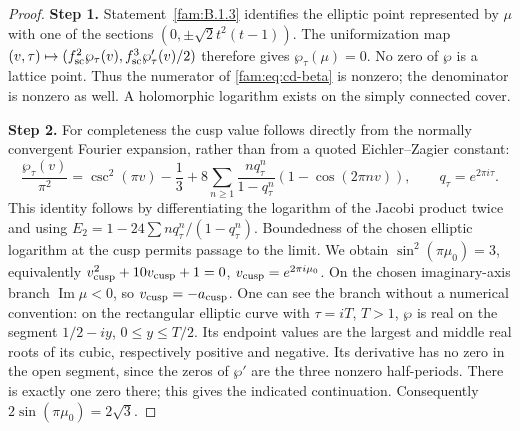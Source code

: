 \documentclass[11pt,a4paper]{article}
\theoremstyle{plain}
\theoremstyle{definition}
\begin{document}
\begin{proof}
\noindent\textbf{Step 1.} Statement~\ref{fam:B.1.3} identifies the elliptic point represented by \(\mu\) with
one of the sections \((0,\pm\sqrt2t^2(t-1))\). The uniformization map
\((v,\tau)\mapsto(f_{\rm sc}^2\wp_\tau(v),f_{\rm sc}^3\wp'_\tau(v)/2)\) therefore gives
\(\wp_\tau(\mu)=0\). No zero of \(\wp\) is a lattice point. Thus the numerator
of \eqref{fam:eq:cd-beta} is nonzero; the denominator is nonzero as well.
A holomorphic logarithm exists on the simply connected cover.


\noindent\textbf{Step 2.} For completeness the cusp value follows directly from the normally
convergent Fourier expansion, rather than from a quoted Eichler--Zagier
constant:
\begin{equation}\label{fam:eq:cd-wp}
 \frac{\wp_\tau(v)}{\pi^2}
 =\csc^2(\pi v)-\frac13+
 8\sum_{n\geq1}\frac{nq_\tau^n}{1-q_\tau^n}(1-\cos(2\pi nv)),
 \qquad q_\tau=e^{2\pi i\tau}.
\end{equation}
This identity follows by differentiating the logarithm of the Jacobi
product twice and using
\(E_2=1-24\sum nq_\tau^n/(1-q_\tau^n)\). Boundedness of the chosen elliptic logarithm
at the cusp permits passage to the limit. We obtain
\(\sin^2(\pi\mu_0)=3\), equivalently
\(v_{\rm cusp}^2+10v_{\rm cusp}+1=0\), \(v_{\rm cusp}=e^{2\pi i\mu_0}\).
On the chosen imaginary-axis branch \(\operatorname{Im}\mu<0\), so \(v_{\rm cusp}=-a_{\rm cusp}\).
One can see the branch without a numerical convention: on the rectangular
elliptic curve with \(\tau=iT\), \(T>1\), \(\wp\) is real on the segment
\(1/2-iy\), \(0\leq y\leq T/2\). Its endpoint values are the largest and
middle real roots of its cubic, respectively positive and negative.
Its derivative has no zero in the open segment, since the zeros of
\(\wp'\) are the three nonzero half-periods. There is exactly one zero
there; this gives the indicated continuation. Consequently
\(2\sin(\pi\mu_0)=2\sqrt3\).



\end{proof}
\end{document}
